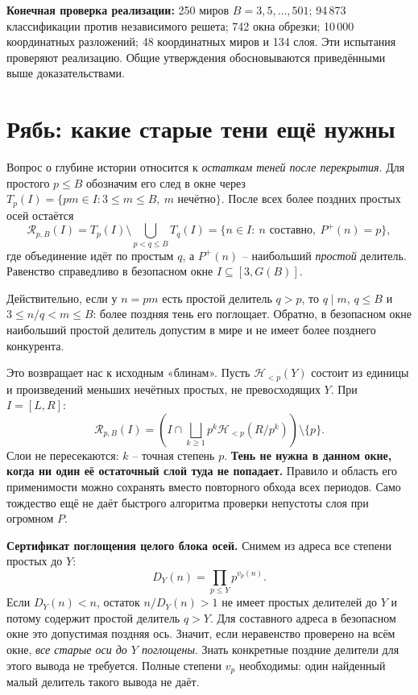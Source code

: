 \documentclass[11pt,a4paper]{article}
\begin{document}
\textbf{Конечная проверка реализации:} 250 миров $B=3,5,\ldots,501$; 94\,873 классификации против независимого решета; 742 окна обрезки; 10\,000 координатных разложений; 48 координатных миров и 134 слоя. Эти испытания проверяют реализацию. Общие утверждения обосновываются приведёнными выше доказательствами.

\section{Рябь: какие старые тени ещё нужны}

Вопрос о глубине истории относится к \emph{остаткам теней после перекрытия}. Для простого $p\le B$ обозначим его след в окне через $T_p(I)=\{pm\in I:3\le m\le B,\ m\text{ нечётно}\}$. После всех более поздних простых осей остаётся
\[
 \mathcal R_{p,B}(I)=T_p(I)\setminus\!\bigcup_{p<q\le B}T_q(I)
 =\{n\in I:\ n\text{ составно},\ P^+(n)=p\},
\]
где объединение идёт по простым $q$, а $P^+(n)$ -- наибольший \emph{простой} делитель. Равенство справедливо в безопасном окне $I\subseteq[3,G(B)]$.

Действительно, если у $n=pm$ есть простой делитель $q>p$, то $q\mid m$, $q\le B$ и $3\le n/q<m\le B$: более поздняя тень его поглощает. Обратно, в безопасном окне наибольший простой делитель допустим в мире и не имеет более позднего конкурента.

Это возвращает нас к исходным «блинам». Пусть $\mathcal H_{<p}(Y)$ состоит из единицы и произведений меньших нечётных простых, не превосходящих $Y$. При $I=[L,R]$:
\[
 \mathcal R_{p,B}(I)=
 \left(I\cap\bigsqcup_{k\ge1}p^k\mathcal H_{<p}(R/p^k)\right)\setminus\{p\}.
\]
Слои не пересекаются: $k$ -- точная степень $p$. \textbf{Тень не нужна в данном окне, когда ни один её остаточный слой туда не попадает.} Правило и область его применимости можно сохранять вместо повторного обхода всех периодов. Само тождество ещё не даёт быстрого алгоритма проверки непустоты слоя при огромном $P$.

\textbf{Сертификат поглощения целого блока осей.} Снимем из адреса все степени простых до $Y$:
\[
 D_Y(n)=\prod_{p\le Y}p^{v_p(n)}.
\]
Если $D_Y(n)<n$, остаток $n/D_Y(n)>1$ не имеет простых делителей до $Y$ и потому содержит простой делитель $q>Y$. Для составного адреса в безопасном окне это допустимая поздняя ось. Значит, если неравенство проверено на всём окне, \emph{все старые оси до $Y$ поглощены}. Знать конкретные поздние делители для этого вывода не требуется. Полные степени $v_p$ необходимы: один найденный малый делитель такого вывода не даёт.
\end{document}
